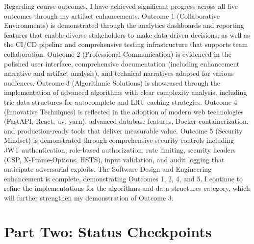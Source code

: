 \documentclass[12pt,stu]{apa7}
\begin{document}
Regarding course outcomes, I have achieved significant progress across all five outcomes through my artifact enhancements. Outcome 1 (Collaborative Environments) is demonstrated through the analytics dashboards and reporting features that enable diverse stakeholders to make data-driven decisions, as well as the CI/CD pipeline and comprehensive testing infrastructure that supports team collaboration. Outcome 2 (Professional Communication) is evidenced in the polished user interface, comprehensive documentation (including enhancement narrative and artifact analysis), and technical narratives adapted for various audiences. Outcome 3 (Algorithmic Solutions) is showcased through the implementation of advanced algorithms with clear complexity analysis, including trie data structures for autocomplete and LRU caching strategies. Outcome 4 (Innovative Techniques) is reflected in the adoption of modern web technologies (FastAPI, React, uv, yarn), advanced database features, Docker containerization, and production-ready tools that deliver measurable value. Outcome 5 (Security Mindset) is demonstrated through comprehensive security controls including JWT authentication, role-based authorization, rate limiting, security headers (CSP, X-Frame-Options, HSTS), input validation, and audit logging that anticipate adversarial exploits. The Software Design and Engineering enhancement is complete, demonstrating Outcomes 1, 2, 4, and 5. I continue to refine the implementations for the algorithms and data structures category, which will further strengthen my demonstration of Outcome 3.

\section*{Part Two: Status Checkpoints}
\end{document}
